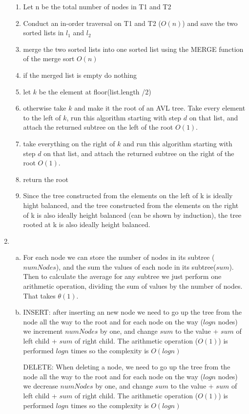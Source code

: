 \documentclass[11pt]{article}
\begin{document}
\begin{enumerate}
	\begin{enumerate}
		\item Let n be the total number of nodes in T1 and T2
		\item Conduct an in-order traversal on T1 and T2 ($O(n)$) and save the two sorted lists in $l_1$ and $l_2$
		\item merge the two sorted lists into one sorted list using the MERGE function of the merge sort $O(n)$
		\item if the merged list is empty do nothing
		\item let $k$ be the element at floor(list.length /2)
		\item otherwise take $k$ and make it the root of an AVL tree. Take every element to the left of $k$, run this algorithm starting with step $d$ on that list, and attach the returned subtree on the left of the root $O(1)$.
		\item take everything on the right of $k$ and run this algorithm starting with step $d$ on that list, and attach the returned subtree on the right of the root $O(1)$.
		\item return the root
		
		\item Since the tree constructed from the elements on the left of k is ideally hight balanced, and the tree constructed from the elements on the right of k is also ideally height balanced (can be shown by induction), the tree rooted at k is also ideally height balanced.
	\end{enumerate}
	
	\item 
	\begin{enumerate}[a)]
		\item  
		For each node we can store the number of nodes in its subtree ($numNodes$), and the sum the values of each node in its subtree($sum$). Then to calculate the average for any subtree we just perform one arithmetic operation, dividing the sum of values by the number of nodes. That takes $\theta (1)$.
		\item
		

			INSERT: after inserting an new node we need to go up the tree from the node all the way to the root and for each node on the way ($log n$ nodes) we increment $numNodes$ by one, and change $sum$ to the value + $sum$ of left child + $sum$ of right child. The arithmetic operation ($O(1)$) is performed $log n$ times so the complexity is $O(logn)$
			
			
			 DELETE: When deleting a node, we need to go up the tree from the node all the way to the root and for each node on the way ($log n$ nodes) we decrease $numNodes$ by one, and change $sum$ to the value + $sum$ of left child + $sum$ of right child. The arithmetic operation ($O(1)$) is performed $log n$ times so the complexity is $O(logn)$


\end{enumerate}
\end{enumerate}
\end{document}

